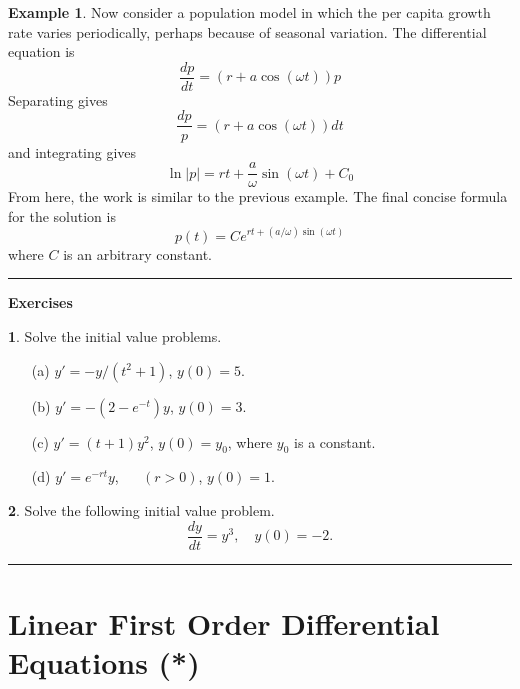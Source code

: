 \documentclass[reqno]{immbook}
\newcommand{\ds}{\displaystyle}
\numberwithin{equation}{chapter}
\numberwithin{question}{section}
\numberwithin{theorem}{chapter}
\numberwithin{figure}{chapter}
\theoremstyle{definition}
\newtheorem{exercise}{}[section]
\newtheorem{example}{Example}[section]
\newenvironment{exercises}%
{%
\medskip\hrule\medskip\noindent\textbf{Exercises}%
}%
{%
\medskip\hrule
}
\begin{document}
\begin{example}
Now consider a population model in which the per capita growth
rate varies periodically, perhaps because of seasonal variation.
The differential equation is
\begin{equation}
   \frac{dp}{dt} = (r + a\cos(\omega t))p
\end{equation}
Separating gives
\begin{equation}
  \frac{dp}{p} = \left( r+a\cos(\omega t) \right) dt
\end{equation}
and integrating gives
\begin{equation}
  \ln | p | = rt + \frac{a}{\omega} \sin(\omega t) + C_0
\end{equation}
From here, the work is similar to the previous example.
The final concise formula for the solution is
\begin{equation}
   p(t) = Ce^{rt + (a/\omega)\sin(\omega t)}
\end{equation}
where $C$ is an arbitrary constant.
\end{example}
%
\begin{exercises}
\begin{exercise}
Solve the initial value problems.
\begin{enumerate}
\item[(a)] $\ds y' = -y/(t^2+1)$, \hspace{0.25cm} $y(0)=5$.
\item[(b)] $\ds y' = -\left(2-e^{-t}\right)y$, \hspace{0.25cm} $y(0)=3$.
\item[(c)] $\ds y' = (t+1)y^2$, \hspace{0.25cm} $y(0)=y_0$, where $y_0$ is
a constant.
\item[(d)] $\ds y' = e^{-rt}y$, ~~ $(r > 0)$, \hspace{0.25cm}
                                       $y(0)=1$.
\end{enumerate}
\end{exercise}
\begin{exercise}
\label{ex:SolveFirstOrderYCubed}
Solve the following initial value problem.
\[
  \frac{dy}{dt} = y^3, \quad y(0)=-2.
\]
\end{exercise}
\end{exercises}
%

\newpage

\section{Linear First Order Differential Equations (*)}
\end{document}
